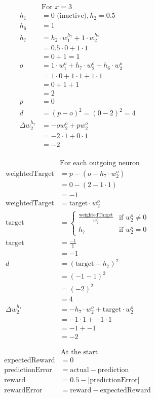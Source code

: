 \documentclass{article}
\begin{document}
\begin{minipage}[th]{0.4\textwidth}
\begin{align*}
	&\text{For }x=3 \\   
	h_1 &= 0\text{ (inactive)}, h_2 = 0.5\\
	h_6 &= 1\\
	h_7 &= h_2 \cdot w_1^{h_7} + 1 \cdot w_2^{h_7}\\
	&= 0.5 \cdot 0 + 1 \cdot 1\\
	&= 0+1= 1\\
	o &= 1 \cdot w_1^o + h_7 \cdot w_2^o+h_6\cdot w_3^o\\
	&= 1\cdot 0 +1 \cdot 1 + 1 \cdot 1\\
	&=0+1+1\\
	&=2\\
	p &= 0\\
	d &= (p - o)^2 = (0 - 2)^2 = 4\\
	\Delta w_2^{h_7}&=-ow_2^o+pw_2^o\\
	&=-2\cdot 1+0\cdot 1\\
	&=-2\\
\end{align*}
\end{minipage}
\begin{minipage}[th]{0.4\textwidth}
\begin{align*}
	&\text{For each outgoing neuron}\\
	\text{weightedTarget}&=p-(o-h_7\cdot w_2^o)\\
	&=0-(2-1\cdot 1)\\
	&=-1\\
	\text{weightedTarget}&=\text{target}\cdot w_2^o\\
	\text{target}&=\begin{cases} 
		\frac{\text{weightedTarget}}{w_2^o} &\text{if } w_2^o \ne0\\
		h_7 &\text{if } w_2^o=0
	\end{cases}\\
	\text{target}&=\frac{-1}{1}\\
	&=-1\\
	d&=(\text{target}-h_7)^2\\
	&=(-1-1)^2\\
	&=(-2)^2\\
	&=4\\
	\Delta w^{h_7}_2&=-h_7\cdot w_2^o+\text{target}\cdot w_2^o\\
	&=-1\cdot 1 + -1 \cdot 1\\
	&=-1+-1\\
	&=-2
\end{align*}

\begin{align*}
	&\text{At the start}\\
	\text{expectedReward}&=0\\
\text{predictionError} &= \text{actual} - \text{prediction}\\
\text{reward}&=0.5-|\text{predictionError}|\\
\text{rewardError}&=\text{reward}-\text{expectedReward}
\end{align*}
\end{minipage}
\end{document}

